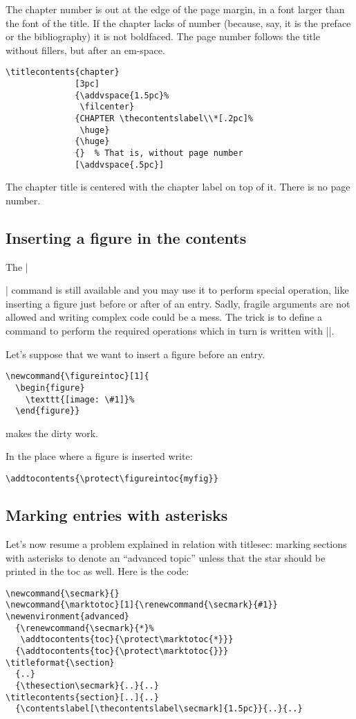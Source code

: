 \documentclass[a4paper]{ltxguide}
\begin{document}
The chapter number is out at the edge of the page margin, in a font
larger than the font of the title. If the chapter lacks of number
(because, say, it is the preface or the bibliography) it is not
boldfaced. The page number follows the title without fillers, but
after an em-space.

\begin{verbatim}
\titlecontents{chapter}
              [3pc]
              {\addvspace{1.5pc}%
               \filcenter}
              {CHAPTER \thecontentslabel\\*[.2pc]%
               \huge}
              {\huge}
              {}  % That is, without page number
              [\addvspace{.5pc}]
\end{verbatim}
              
The chapter title is centered with the chapter label on top
of it. There is no page number.

\subsection{Inserting a figure in the contents}

The |\addtocontents| command is still available and you may use
it to perform special operation, like inserting a figure just before
or after of an entry. Sadly, fragile
arguments are not allowed and writing complex code could be a mess.
The trick is to define a command to perform the required operations
which in turn is written with |\protect|.

Let's suppose that we want to insert a figure before an entry.
\begin{verbatim}
\newcommand{\figureintoc}[1]{
  \begin{figure}
    \texttt{[image: \#1]}%
  \end{figure}}
\end{verbatim}
makes the dirty work.

In the place where a figure is inserted write:
\begin{verbatim}
\addtocontents{\protect\figureintoc{myfig}}
\end{verbatim}

\subsection{Marking entries with asterisks}

Let's now resume a problem explained in relation with
\textsf{titlesec}: marking sections with asterisks to
denote an ``advanced topic'' unless that the star should
be printed in the toc as well. Here is the code:
\begin{verbatim}
\newcommand{\secmark}{}
\newcommand{\marktotoc}[1]{\renewcommand{\secmark}{#1}}
\newenvironment{advanced}
  {\renewcommand{\secmark}{*}%
   \addtocontents{toc}{\protect\marktotoc{*}}}
  {\addtocontents{toc}{\protect\marktotoc{}}}
\titleformat{\section}
  {..}
  {\thesection\secmark}{..}{..}
\titlecontents{section}[..]{..}
  {\contentslabel[\thecontentslabel\secmark]{1.5pc}}{..}{..}
\end{verbatim}
\end{document}
